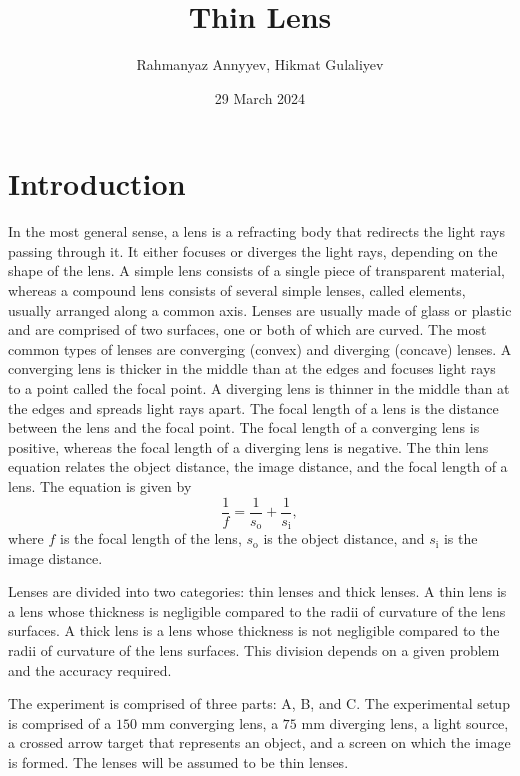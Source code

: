 \documentclass[10pt]{article}
\title{Thin Lens}
\author{Rahmanyaz Annyyev, Hikmat Gulaliyev}
\date{29 March 2024}
\begin{document}
\maketitle

\begin{abstract}

\end{abstract}

\section{Introduction}

In the most general sense, a lens is a refracting body that redirects the light rays passing through it. It either focuses or diverges the light rays, depending on the shape of the lens. A simple lens consists of a single piece of transparent material, whereas a compound lens consists of several simple lenses, called elements, usually arranged along a common axis. Lenses are usually made of glass or plastic and are comprised of two surfaces, one or both of which are curved. The most common types of lenses are converging (convex) and diverging (concave) lenses. A converging lens is thicker in the middle than at the edges and focuses light rays to a point called the focal point. A diverging lens is thinner in the middle than at the edges and spreads light rays apart. The focal length of a lens is the distance between the lens and the focal point. The focal length of a converging lens is positive, whereas the focal length of a diverging lens is negative. The thin lens equation relates the object distance, the image distance, and the focal length of a lens. The equation is given by
\begin{equation}
  \frac{1}{f} = \frac{1}{s_{\text{o}}} + \frac{1}{s_{\text{i}}},
\end{equation}
where $f$ is the focal length of the lens, $s_{\text{o}}$ is the object distance, and $s_{\text{i}}$ is the image distance. 

Lenses are divided into two categories: thin lenses and thick lenses. A thin lens is a lens whose thickness is negligible compared to the radii of curvature of the lens surfaces. A thick lens is a lens whose thickness is not negligible compared to the radii of curvature of the lens surfaces. This division depends on a given problem and the accuracy required. 

The experiment is comprised of three parts: A, B, and C. The experimental setup is comprised of a $150$ mm converging lens, a $75$ mm diverging lens, a light source, a crossed arrow target that represents an object, and a screen on which the image is formed. The lenses will be assumed to be thin lenses.
\end{document}
